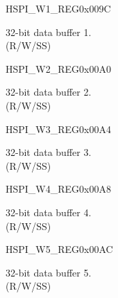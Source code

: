 \begin{register}{H}{SPI\_W1\_REG}{0x009C}\label{regdesc:SPIW1REG}
%
\regnewline%
\begin{regdesc}\begin{reglist}
\label{fielddesc:SPIBUF1}\item [SPI\_BUF1] 32-bit data buffer 1.\\
(R/W/SS)
\end{reglist}\end{regdesc}
\end{register}


\begin{register}{H}{SPI\_W2\_REG}{0x00A0}\label{regdesc:SPIW2REG}
%
\regnewline%
\begin{regdesc}\begin{reglist}
\label{fielddesc:SPIBUF2}\item [SPI\_BUF2] 32-bit data buffer 2.\\
(R/W/SS)
\end{reglist}\end{regdesc}
\end{register}


\begin{register}{H}{SPI\_W3\_REG}{0x00A4}\label{regdesc:SPIW3REG}
%
\regnewline%
\begin{regdesc}\begin{reglist}
\label{fielddesc:SPIBUF3}\item [SPI\_BUF3] 32-bit data buffer 3. \\
(R/W/SS)
\end{reglist}\end{regdesc}
\end{register}


\begin{register}{H}{SPI\_W4\_REG}{0x00A8}\label{regdesc:SPIW4REG}
%
\regnewline%
\begin{regdesc}\begin{reglist}
\label{fielddesc:SPIBUF4}\item [SPI\_BUF4] 32-bit data buffer 4.\\
(R/W/SS)
\end{reglist}\end{regdesc}
\end{register}


\begin{register}{H}{SPI\_W5\_REG}{0x00AC}\label{regdesc:SPIW5REG}
%
\regnewline%
\begin{regdesc}\begin{reglist}
\label{fielddesc:SPIBUF5}\item [SPI\_BUF5] 32-bit data buffer 5. \\
(R/W/SS)
\end{reglist}\end{regdesc}
\end{register}


